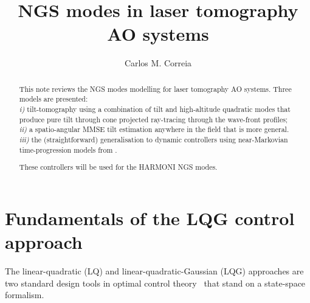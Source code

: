 \documentclass[a4paper,12pt]{article}
\title{NGS modes in laser tomography AO systems}
\author{Carlos M. Correia}%
\newcommand{\0}{\mathsf{0}} %
\begin{document}
\maketitle 

\begin{abstract}
This note reviews the NGS modes modelling for laser tomography AO
systems. Three models are presented: \\
\textit{i)} tilt-tomography using a
combination of tilt and high-altitude quadratic modes that produce
pure tilt through cone projected ray-tracing through the wave-front
profiles; \\
\textit{ii)} a spatio-angular MMSE tilt estimation
anywhere in the field that is more general. \\
\textit{iii)} the
(straightforward) generalisation to dynamic controllers using
near-Markovian time-progression models from \cite{correia15}. 

These controllers will be used for the HARMONI NGS modes.
\end{abstract}

\vspace{50pt}
\newpage
\tableofcontents









\newpage
        \section{Fundamentals of the LQG control approach }\label{sec:reviewLQG}

        The linear-quadratic (LQ) and linear-quadratic-Gaussian (LQG)
        approaches are two standard design tools in optimal control
        theory~\cite{barshalom74,andersonmoore_optimalcontrolLQG05}
        that stand on a state-space formalism. 
\end{document}
